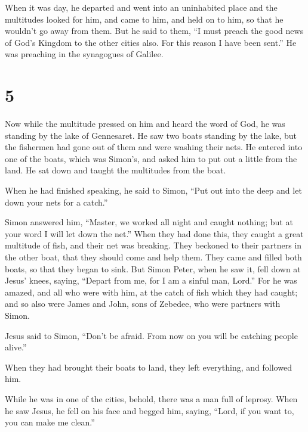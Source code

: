  When it was day, he departed and went into an
uninhabited place and the multitudes looked for him, and came to him,
and held on to him, so that he wouldn't go away from them.
 But he said to them, ``I must preach the good news of
God's Kingdom to the other cities also. For this reason I have been
sent.''  He was preaching in the synagogues of Galilee.

\hypertarget{section-4}{%
\section{5}\label{section-4}}

 Now while the multitude pressed on him and heard the word
of God, he was standing by the lake of Gennesaret.  He saw
two boats standing by the lake, but the fishermen had gone out of them
and were washing their nets.  He entered into one of the
boats, which was Simon's, and asked him to put out a little from the
land. He sat down and taught the multitudes from the boat.

 When he had finished speaking, he said to Simon, ``Put
out into the deep and let down your nets for a catch.''

 Simon answered him, ``Master, we worked all night and
caught nothing; but at your word I will let down the net.''
 When they had done this, they caught a great multitude of
fish, and their net was breaking.  They beckoned to their
partners in the other boat, that they should come and help them. They
came and filled both boats, so that they began to sink. 
But Simon Peter, when he saw it, fell down at Jesus' knees, saying,
``Depart from me, for I am a sinful man, Lord.''  For he
was amazed, and all who were with him, at the catch of fish which they
had caught;  and so also were James and John, sons of
Zebedee, who were partners with Simon.

Jesus said to Simon, ``Don't be afraid. From now on you will be catching
people alive.''

 When they had brought their boats to land, they left
everything, and followed him.

 While he was in one of the cities, behold, there was a
man full of leprosy. When he saw Jesus, he fell on his face and begged
him, saying, ``Lord, if you want to, you can make me clean.''

